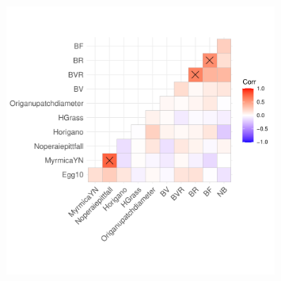 \documentclass[10pt]{beamer}
\begin{document}
\begin{frame}[fragile]
% 
% 
% 
% 
% 
% 
% 
% 




\begin{figure}
\includegraphics[width=0.8\textwidth]{pictures/Rplot-datiglm-correlazioni2.pdf}
\end{figure}
% 

\end{frame}
\end{document}
